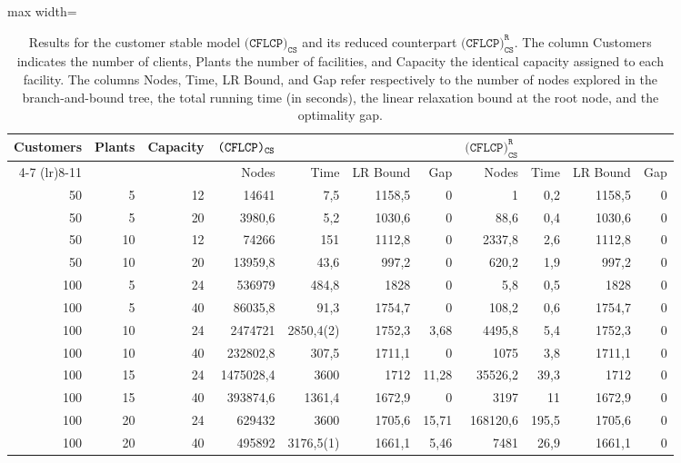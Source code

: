 \documentclass[preprint,11pt,authoryear]{elsarticle}
\newcommand\red[1]{{\color{red}#1}}
\begin{document}
\begin{table}%
\centering
\begin{adjustbox}{max width=\textwidth}
\begin{tabular}{rrr  rrrr rrrr}
\toprule
Customers & Plants & Capacity & ${\normalfont\texttt{(CFLCP)}_{\texttt{CS}}}$ & & & & $\texttt{(CFLCP)}_{\texttt{CS}}^\texttt{R}$ & & & \\
\cmidrule(lr){4-7} \cmidrule(lr){8-11}
& & & Nodes & Time & LR Bound & Gap & Nodes & Time & LR Bound & Gap \\
\midrule
50&5&12&14641&7,5&1158,5&0&1&0,2&1158,5&0\\
50&5&20&3980,6&5,2&1030,6&0&88,6&0,4&1030,6&0\\[2mm]
50&10&12&74266&151&1112,8&0&2337,8&2,6&1112,8&0\\
50&10&20&13959,8&43,6&997,2&0&620,2&1,9&997,2&0\\[2mm]
100&5&24&536979&484,8&1828&0&5,8&0,5&1828&0\\
100&5&40&86035,8&91,3&1754,7&0&108,2&0,6&1754,7&0\\[2mm]
100&10&24&2474721&2850,4(2)&1752,3&3,68&4495,8&5,4&1752,3&0\\
100&10&40&232802,8&307,5&1711,1&0&1075&3,8&1711,1&0\\[2mm]
100&15&24&1475028,4&3600&1712&11,28&35526,2&39,3&1712&0\\
100&15&40&393874,6&1361,4&1672,9&0&3197&11&1672,9&0\\[2mm]
100&20&24&629432&3600&1705,6&15,71&168120,6&195,5&1705,6&0\\
100&20&40&495892&3176,5(1)&1661,1&5,46&7481&26,9&1661,1&0\\
\bottomrule
\end{tabular}
\end{adjustbox}
\caption{Results for the customer stable model \(\texttt{(CFLCP)}_{\texttt{CS}}\) and its reduced counterpart \(\texttt{(CFLCP)}_{\texttt{CS}}^\texttt{R}\). The column Customers indicates the number of clients, Plants the number of facilities, and Capacity the identical capacity assigned to each facility. The columns Nodes, Time, LR Bound, and Gap refer respectively to the number of nodes explored in the branch-and-bound tree, the total running time (in seconds), the linear relaxation bound at the root node, and the optimality gap.}
\label{tab:customer-results}
\end{table}
\end{document}
